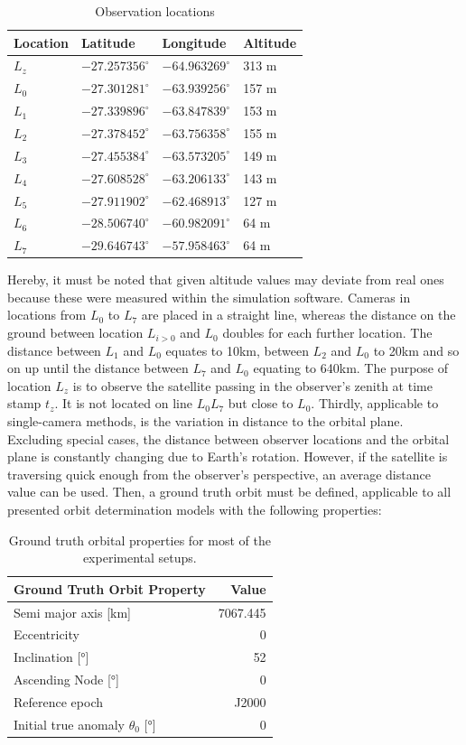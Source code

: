 \documentclass[10pt,a4paper]{article}
\begin{document}
	
	\begin{table}[htbp]
		\centering
		\begin{tabular}{llll}
			\toprule
			Location & Latitude & Longitude & Altitude \\
			\midrule
			$L_z$ & $-27.257356^\circ$ & $-64.963269^\circ$ & 313 m \\
			$L_0$ & $-27.301281^\circ$ & $-63.939256^\circ$ & 157 m \\
			$L_1$ & $-27.339896^\circ$ & $-63.847839^\circ$ & 153 m \\
			$L_2$ & $-27.378452^\circ$ & $-63.756358^\circ$ & 155 m \\
			$L_3$ & $-27.455384^\circ$ & $-63.573205^\circ$ & 149 m \\
			$L_4$ & $-27.608528^\circ$ & $-63.206133^\circ$ & 143 m \\
			$L_5$ & $-27.911902^\circ$ & $-62.468913^\circ$ & 127 m \\
			$L_6$ & $-28.506740^\circ$ & $-60.982091^\circ$ & 64 m \\
			$L_7$ & $-29.646743^\circ$ & $-57.958463^\circ$ & 64 m \\
			\bottomrule
		\end{tabular}
		\caption{Observation locations}
		\label{tab:observation_locations}
	\end{table}
	\noindent
	Hereby, it must be noted that given altitude values may deviate from real ones because these were measured within the simulation software. Cameras in locations from $L_0$ to $L_7$ are placed in a straight line, whereas the distance on the ground between location $L_{i>0}$ and $L_0$ doubles for each further location. The distance between $L_1$ and $L_0$ equates to 10km, between $L_2$ and $L_0$ to 20km and so on up until the distance between $L_7$ and $L_0$ equating to 640km. The purpose of location $L_z$ is to observe the satellite passing in the observer's zenith at time stamp $t_z$. It is not located on line $L_0L_7$ but close to $L_0$.\newline
	Thirdly, applicable to single-camera methods, is the variation in distance to the orbital plane. Excluding special cases, the distance between observer locations and the orbital plane is constantly changing due to Earth's rotation. However, if the satellite is traversing quick enough from the observer's perspective, an average distance value can be used.
	Then, a ground truth orbit must be defined, applicable to all presented orbit determination models with the following properties:
	\begin{table}[H]
		\centering
		\begin{tabular}{l|r}
			Ground Truth Orbit Property & Value \\\hline
			Semi major axis [km] & 7067.445 \\
			Eccentricity & 0 \\
			Inclination [°] & 52 \\
			Ascending Node [°] & 0 \\
			Reference epoch & J2000 \\
			Initial true anomaly $\theta_0$ [°] & 0
		\end{tabular}
		\caption{Ground truth orbital properties for most of the experimental setups.}
		\label{tab:ground_truth_orbit}
	\end{table}
\end{document}

